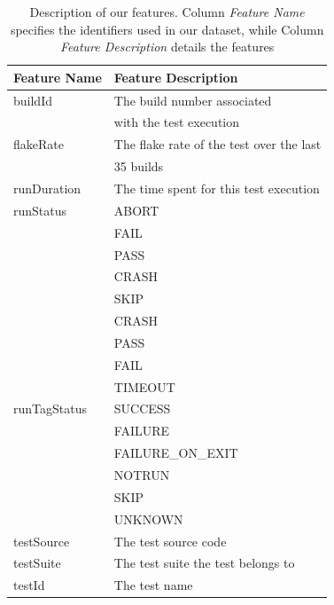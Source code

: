 \begin{table}[ht]
\centering
\caption{Description of our features. Column \textit{Feature Name} specifies the identifiers used in our dataset, while Column \textit{Feature Description} details the features}
\label{table:infoRuns}
\begin{tabular}{ l | l } 
\toprule
\textbf{Feature Name} & \textbf{Feature Description} \\
\midrule
buildId & The build number associated \\
{} & with the test execution \\
\midrule
flakeRate & The flake rate of the test over the last\\  
{} & 35 builds \\
\midrule
runDuration & The time spent for this test execution \\
\midrule
runStatus & ABORT\\ {} & FAIL\\ {} & PASS\\ {} & CRASH\\ {} & SKIP \\
\midrule
\multirow[t]{9}{*}{runTagStatus} & CRASH\\ {} & PASS\\ {} & FAIL\\ {} & TIMEOUT\\ {} & SUCCESS \\
{} & FAILURE\\ {} & FAILURE\_ON\_EXIT\\ {} & NOTRUN\\ {} & SKIP\\ {} & UNKNOWN \\
\midrule
testSource & The test source code \\
\midrule
testSuite & The test suite the test belongs to \\
\midrule
testId & The test name \\
\bottomrule
\end{tabular}
\vspace{1.0em}
\end{table}

